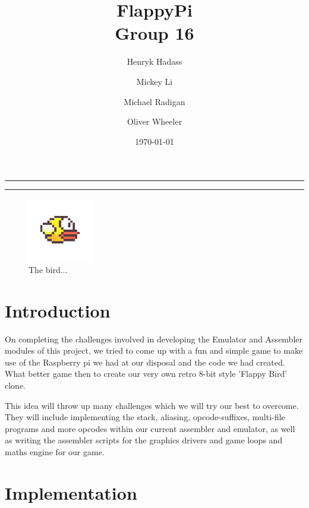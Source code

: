 \documentclass[11pt]{article}
\begin{document}
\title{
	{\huge\textbf{FlappyPi}} \\		
	Group 16
	}

\author{Henryk Hadass \and Mickey Li \and Michael Radigan \and Oliver Wheeler}
\date{\today}
\maketitle

\noindent
\rule{8cm}{0.6pt}

\tableofcontents

\noindent
\rule{8cm}{0.6pt}
\begin{figure}
  \vspace{-10pt}
  \begin{center}
    \includegraphics[width=0.25\textwidth]{flappyBird.png}
  \end{center}
  \vspace{-30pt}
  \caption{The bird...}
  \vspace{-20pt}
\end{figure}
\section{Introduction}
On completing the challenges involved in developing the Emulator and Assembler modules of this project, we tried to come up with a fun and simple game to make use of the Raspberry pi we had at our disposal and the code we had created. What better game then to create our very own retro 8-bit style 'Flappy Bird' clone.

This idea will throw up many challenges which we will try our best to overcome. They will include implementing the stack, aliasing, opcode-suffixes, multi-file programs and more opcodes within our current assembler and emulator, as well as writing the assembler scripts for the graphics drivers and game loops and maths engine for our game. 



\pagebreak

\section{Implementation}
\end{document}

